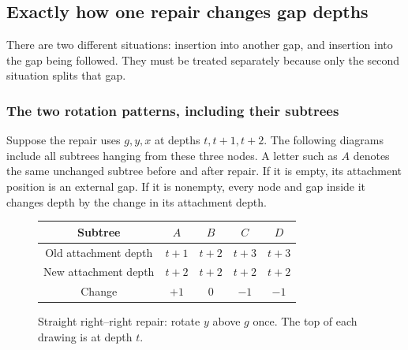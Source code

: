 \documentclass[11pt,a4paper]{article}
\theoremstyle{readable}
\begin{document}
\subsection{Exactly how one repair changes gap depths}
\label{sec:local-effects}

There are two different situations: insertion into another gap, and
insertion into the gap being followed. They must be treated separately
because only the second situation splits that gap.

\subsubsection*{The two rotation patterns, including their subtrees}
Suppose the repair uses $g,y,x$ at depths $t,t+1,t+2$. The following
diagrams include all subtrees hanging from these three nodes. A letter
such as $A$ denotes the same unchanged subtree before and after repair.
If it is empty, its attachment position is an external gap. If it is
nonempty, every node and gap inside it changes depth by the change in
its attachment depth.

\begin{figure}[H]
\centering
{}

\smallskip
\begin{tabular}{ccccc}
\toprule
Subtree & $A$ & $B$ & $C$ & $D$ \\
\midrule
Old attachment depth & $t+1$ & $t+2$ & $t+3$ & $t+3$ \\
New attachment depth & $t+2$ & $t+2$ & $t+2$ & $t+2$ \\
Change & $+1$ & $0$ & $-1$ & $-1$ \\
\bottomrule
\end{tabular}
\caption{Straight right--right repair: rotate $y$ above $g$ once.
The top of each drawing is at depth $t$.}
\label{fig:straight}
\end{figure}
\end{document}
